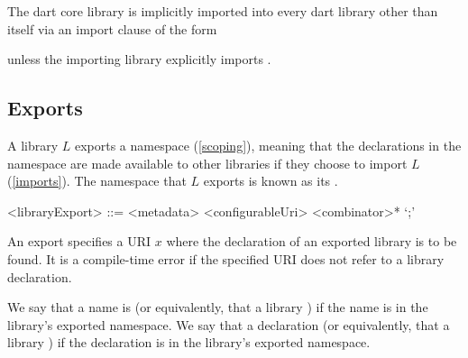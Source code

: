 \documentclass[makeidx]{article}
\begin{document}
{\LMHash{}%
The dart core library  is implicitly imported into every dart library other than itself via an import clause of the form


unless the importing library explicitly imports .




\subsection{Exports}

\LMHash{}%
A library $L$ exports a namespace (\ref{scoping}), meaning that the declarations in the namespace are made available to other libraries if they choose to import $L$ (\ref{imports}).
The namespace that $L$ exports is known as its
.

\begin{grammar}
<libraryExport> ::= <metadata> \EXPORT{} <configurableUri> <combinator>* `;'
\end{grammar}

\LMHash{}%
An export specifies a URI $x$ where the declaration of an exported library is to be found.
It is a compile-time error if the specified URI does not refer to a library declaration.

\LMHash{}%
We say that a name is 
(or equivalently, that a library
)
if the name is in the library's exported namespace.
We say that a declaration 
(or equivalently, that a library
)
if the declaration is in the library's exported namespace.

}
\end{document}
